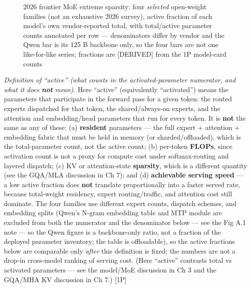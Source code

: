 \begin{figure}[H]
\centering
{}
\caption[2026 frontier MoE extreme sparsity]{2026 frontier MoE extreme sparsity: four \emph{selected} open-weight families (not an exhaustive 2026 survey), active fraction of each model's own vendor-reported total, with total/active parameter counts annotated per row --- denominators differ by vendor and the Qwen bar is its 125 B backbone only, so the four bars are not one like-for-like series; fractions are \mbox{{[}DERIVED{]}} from the 1P model-card counts}
\end{figure}

\emph{Definition of ``active'' (what counts in the activated-parameter
numerator, and what it does \textbf{not} mean).} Here ``active''
(equivalently ``activated'') means the parameters that participate in
the forward pass for a given token: the routed experts dispatched for
that token, the shared/always-on experts, and the attention and
embedding/head parameters that run for every token. It is \textbf{not}
the same as any of these: (a) \textbf{resident} parameters --- the full
expert + attention + embedding fabric that must be held in memory (or
sharded/offloaded), which is the total-parameter count, not the active
count; (b) per-token \textbf{FLOPs}, since activation count is not a
proxy for compute cost under softmax-routing and layered dispatch; (c)
KV or attention-state \textbf{sparsity}, which is a different quantity
(see the GQA/MLA discussion in Ch 7); and (d) \textbf{achievable serving
speed} --- a low active fraction does \textbf{not} translate
proportionally into a faster served rate, because total-weight
residency, expert routing/traffic, and attention cost still dominate.
The four families use different expert counts, dispatch schemes, and
embedding splits (Qwen's N-gram embedding table and MTP module are
excluded from both the numerator and the denominator below --- see the
Fig A.1 note --- so the Qwen figure is a backbone-only ratio, not a
fraction of the deployed parameter inventory; the table is offloadable),
so the active fractions below are comparable only \emph{after} this
definition is fixed; the numbers are not a drop-in cross-model ranking
of serving cost. (Here ``active'' contrasts total vs activated
parameters --- see the model/MoE discussion in Ch 3 and the GQA/MHA KV
discussion in Ch 7.) \mbox{{[}1P{]}}

